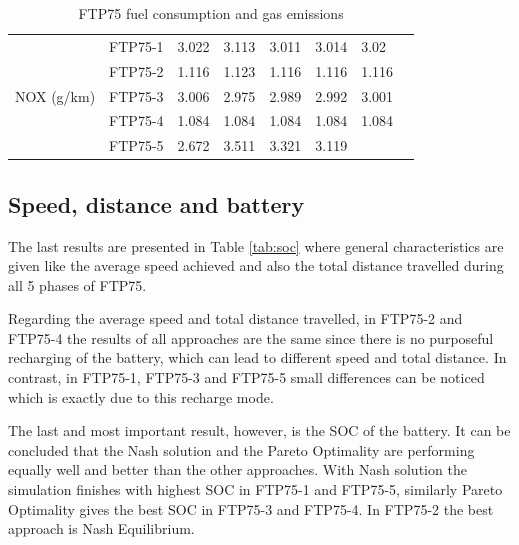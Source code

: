\begin{table}[h]
\begin{tabular}{ |p{1.5cm}|p{1.5cm}|p{1.3cm}|p{1.3cm}|p{1.3cm}|p{1.3cm}|p{1.3cm}|p{1.3cm}|}
 \hline
 \multirow{5}{*}{\parbox{1.5cm}{NOX (g/km)}} 
 & FTP75-1 & 3.022 & 3.113 & 3.011 & 3.014 & 3.02 & \\
 & FTP75-2 & 1.116 & 1.123 & 1.116 & 1.116 & 1.116 & \\ 
 & FTP75-3 & 3.006 & 2.975 & 2.989 & 2.992 & 3.001 & \\ 
 & FTP75-4 & 1.084 & 1.084 & 1.084 & 1.084 & 1.084 & \\ 
 & FTP75-5 & 2.672 & 3.511 & 3.321 & 3.119 & & \\ 
 \hline  
\end{tabular}
\caption{FTP75 fuel consumption and gas emissions}
\label{tab:fuelEmis}
\end{table}

\subsection{Speed, distance and battery}
The last results are presented in Table \ref{tab:soc} where general characteristics are given like the average speed achieved and also the total distance travelled during all 5 phases of FTP75. 

Regarding the average speed and total distance travelled, in FTP75-2 and FTP75-4 the results of all approaches are the same since there is no purposeful recharging of the battery, which can lead to different speed and total distance. In contrast, in FTP75-1, FTP75-3 and FTP75-5 small differences can be noticed which is exactly due to this recharge mode.

The last and most important result, however, is the SOC of the battery. It can be concluded that the Nash solution and the Pareto Optimality are performing equally well and better than the other approaches. With Nash solution the simulation finishes with highest SOC in FTP75-1 and FTP75-5, similarly Pareto Optimality gives the best SOC in FTP75-3 and FTP75-4. In FTP75-2 the best approach is Nash Equilibrium. 


